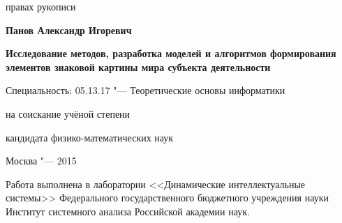 \newcommand{\sfs}{\fontsize{14pt}{15pt}\selectfont}
\sfs %
\thispagestyle{empty}

\vspace{10mm}
\begin{flushright}
   правах рукописи
\end{flushright}

\vspace{30mm}
\begin{center}
{\Large\bf Панов Александр Игоревич}
\end{center}

\vspace{30mm}
\begin{center}
{\bf \LARGE Исследование методов, разработка моделей и алгоритмов формирования элементов знаковой картины мира субъекта деятельности
\par}

\vspace{30mm}
{\Large
Специальность: 05.13.17 "--- Теоретические основы информатики
}

\vspace{15mm}
\par
{} на соискание учёной степени\par
кандидата физико-математических наук
\end{center}

\vspace{40mm}
\begin{center}
{\Large Москва "--- 2015}
\end{center}

\newpage
\thispagestyle{empty}
\noindent Работа выполнена в лаборатории <<Динамические интеллектуальные системы>> Федерального государственного бюджетного учреждения науки Институт системного анализа Российской академии наук.

